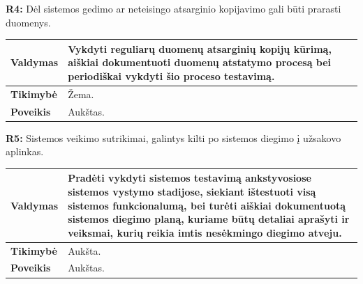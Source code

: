 \documentclass[12pt]{article}
\begin{document}
\noindent \textbf{R4:} Dėl sistemos gedimo ar neteisingo atsarginio kopijavimo
gali būti prarasti duomenys.

\label{sec:R4}
\begin{table}[htb!]
    \captionsetup{justification=centering}
    \vskip -10pt
    \begin{tabular}{|m{3cm}|m{13.7cm}|}
        \hline
        \raggedleft \textbf{\cellcolor{deepchampagne}Valdymas} &
        Vykdyti reguliarų duomenų atsarginių kopijų kūrimą, aiškiai dokumentuoti
        duomenų atstatymo procesą bei periodiškai vykdyti šio proceso
        testavimą. \\
        \hline
        \raggedleft \textbf{\cellcolor{deepchampagne}Tikimybė} & Žema. \\
        \hline
        \raggedleft \textbf{\cellcolor{deepchampagne}Poveikis} & Aukštas. \\
        \hline
    \end{tabular}
\end{table}

\noindent \textbf{R5:} Sistemos veikimo sutrikimai, galintys kilti po
sistemos diegimo į užsakovo aplinkas.

\label{sec:R5}
\begin{table}[htb!]
    \captionsetup{justification=centering}
    \vskip -10pt
    \begin{tabular}{|m{3cm}|m{13.7cm}|}
        \hline
        \raggedleft \textbf{\cellcolor{deepchampagne}Valdymas} &
        Pradėti vykdyti sistemos testavimą ankstyvosiose sistemos vystymo
        stadijose, siekiant ištestuoti visą sistemos funkcionalumą, bei turėti
        aiškiai dokumentuotą sistemos diegimo planą, kuriame būtų detaliai
        aprašyti ir veiksmai, kurių reikia imtis nesėkmingo diegimo atveju. \\
        \hline
        \raggedleft \textbf{\cellcolor{deepchampagne}Tikimybė} & Aukšta. \\
        \hline
        \raggedleft \textbf{\cellcolor{deepchampagne}Poveikis} & Aukštas. \\
        \hline
    \end{tabular}
\end{table}
\end{document}
